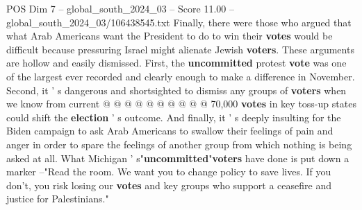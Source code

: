 \begin{textsample}{POS Dim 7 – global\_south\_2024\_03 – Score 11.00 – global\_south\_2024\_03/106438545.txt}
Finally, there were those who argued that what Arab Americans want the President to do to win their \textbf{votes} would be difficult because pressuring Israel might alienate Jewish \textbf{voters}.
These arguments are hollow and easily dismissed.
First, the \textbf{uncommitted} protest \textbf{vote} was one of the largest ever recorded and clearly enough to make a difference in November.
Second, it ' s dangerous and shortsighted to dismiss any groups of \textbf{voters} when we know from current @ @ @ @ @ @ @ @ @ @ 70,000 \textbf{votes} in key toss-up states could shift the \textbf{election} ' s outcome.
And finally, it ' s deeply insulting for the Biden campaign to ask Arab Americans to swallow their feelings of pain and anger in order to spare the feelings of another group from which nothing is being asked at all.
What Michigan ' s"\textbf{uncommitted}"\textbf{voters} have done is put down a marker --"Read the room.
We want you to change policy to save lives.
If you don't, you risk losing our \textbf{votes} and key groups who support a ceasefire and justice for Palestinians."

\end{textsample}
